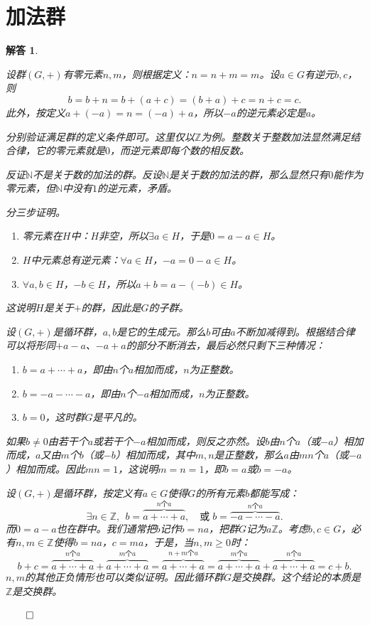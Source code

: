 \documentclass[12pt,UTF8,fontset=none]{ctexbook}
\theoremstyle{exercisestyle}
\theoremstyle{solutionstyle}
\newtheorem*{solution*}{解答}
\newenvironment{solution}
  {\begin{solution*}}
  {\hfill\ensuremath{\qed}\end{solution*}}
\begin{document}
\section{加法群}
\begin{solution}
    \begin{subquestions}
        \item 设群$(G, +)$有零元素$n, m$，则根据定义：$n = n + m = m$。设$a\in G$有逆元$b, c$，则
        $$b = b + n = b + (a + c) = (b + a) + c = n + c = c. $$
        此外，按定义$a + (-a) = n = (-a) + a$，所以$-a$的逆元素必定是$a$。
        \item 分别验证满足群的定义条件即可。这里仅以$\mathbb{Z}$为例。整数关于整数加法显然满足结合律，它的零元素就是$0$，而逆元素即每个数的相反数。
        
        反证$\mathbb{N}$不是关于数的加法的群。反设$\mathbb{N}$是关于数的加法的群，那么显然只有$0$能作为零元素，但$\mathbb{N}$中没有$1$的逆元素，矛盾。
        \item 分三步证明。
        \begin{enumerate}[label=\arabic*.]
            \item 零元素在$H$中：$H$非空，所以$\exists a \in H$，于是$0 = a - a\in H$。
            \item $H$中元素总有逆元素：$\forall a \in H$，$-a = 0 - a \in H$。
            \item $\forall a, b\in H$，$-b\in H$，所以$a + b = a - (-b) \in H$。
        \end{enumerate}
        这说明$H$是关于$+$的群，因此是$G$的子群。
        \item 设$(G, +)$是循环群，$a, b$是它的生成元。那么$b$可由$a$不断加减得到。根据结合律可以将形同$+ a - a$、$-a + a$的部分不断消去，最后必然只剩下三种情况：
        \begin{enumerate}[label=\arabic*.]
            \item $b = a + \cdots + a$，即由$n$个$a$相加而成，$n$为正整数。
            \item $b = -a - \cdots - a$，即由$n$个$-a$相加而成，$n$为正整数。
            \item $b = 0$，这时群$G$是平凡的。
        \end{enumerate}
        如果$b\neq 0$由若干个$a$或若干个$-a$相加而成，则反之亦然。设$b$由$n$个$a$（或$-a$）相加而成，$a$又由$m$个$b$（或$-b$）相加而成，其中$m,n$是正整数，那么$a$由$mn$个$a$（或$-a$）相加而成。因此$mn = 1$，这说明$m = n = 1$，即$b = a$或$b = -a$。
        \item 设$(G, +)$是循环群，按定义有$a\in G$使得$G$的所有元素$b$都能写成：
        $$\exists n \in \mathbb{Z}, \;\, b = \overbrace{a + \cdots + a}^{n\text{个}a}, \quad \mbox{或}\; b = \overbrace{-a - \cdots - a}^{n\text{个}a}.$$
        而$0 = a - a$也在群中。我们通常把$b$记作$b = na$，把群$G$记为$a\mathbb{Z}$。考虑$b, c\in G$，必有$n,m\in \mathbb{Z}$使得$b = na$，$c = ma$，于是，当$n,m \geqslant 0$时：
        $$ b + c = \overbrace{a + \cdots + a}^{n\text{个}a} + \overbrace{a + \cdots + a}^{m\text{个}a} = \overbrace{a + \cdots + a}^{n + m\text{个}a} = \overbrace{a + \cdots + a}^{m\text{个}a} + \overbrace{a + \cdots + a}^{n\text{个}a} = c + b.$$
        $n,m$的其他正负情形也可以类似证明。因此循环群$G$是交换群。这个结论的本质是$\mathbb{Z}$是交换群。


\end{subquestions}
\end{solution}
\end{document}
